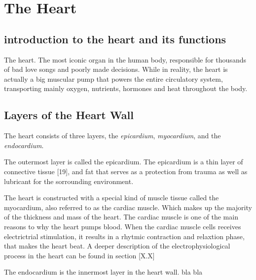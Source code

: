 \chapter{The  Heart}

\section{introduction to the heart and its functions}
The heart. The most iconic organ in the human body, responsible for thousands of bad love songs and poorly made decisions. While in reality, the heart is actually a big muscular pump that powers the entire circulatory system, transporting mainly oxygen, nutrients, hormones and heat throughout the body. 

\section{Layers of the Heart Wall}
The heart consists of three layers, the \textit{epicardium}, \textit{myocardium}, and the \textit{endocardium}. 

The outermost layer is called the epicardium. The epicardium is a thin layer of connective tissue [19], and fat that serves as a protection from trauma as well as lubricant for the sorrounding environment. 

The heart is constructed with a special kind of muscle tissue called the myocardium, also referred to as the cardiac muscle. Which makes up the majority of the thickness and mass of the heart. The cardiac muscle is one of the main reasons to why the heart pumps blood. When the cardiac muscle cells receives electrictrial stimulation, it results in a rhytmic contraction and relaxtion phase, that makes the heart beat. A deeper description of the electrophysiological process in the heart can be found in section [X.X]

The endocardium is the innermost layer in the heart wall. bla bla


